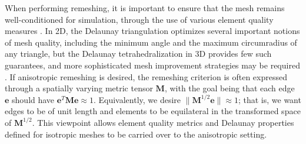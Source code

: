 When performing remeshing, it is important to ensure that the mesh remains well-conditioned for simulation, through the use of various element quality measures \cite{Shewchuk2002}.
In 2D, the Delaunay triangulation optimizes several important notions of mesh quality, including the minimum angle and the maximum circumradius of any triangle, but the Delaunay tetrahedralization in 3D provides few such guarantees, and more sophisticated mesh improvement strategies may be required \cite{Wicke2010}.
If anisotropic remeshing is desired, the remeshing criterion is often expressed through a spatially varying metric tensor $\mathbf M$, with the goal being that each edge $\mathbf e$ should have $\mathbf e^T\mathbf M\mathbf e\approx1$.
Equivalently, we desire $\|\mathbf M^{1/2}\mathbf e\|\approx1$; that is, we want edges to be of unit length and elements to be equilateral in the transformed space of $\mathbf M^{1/2}$.
This viewpoint allows element quality metrics and Delaunay properties defined for isotropic meshes to be carried over to the anisotropic setting.

